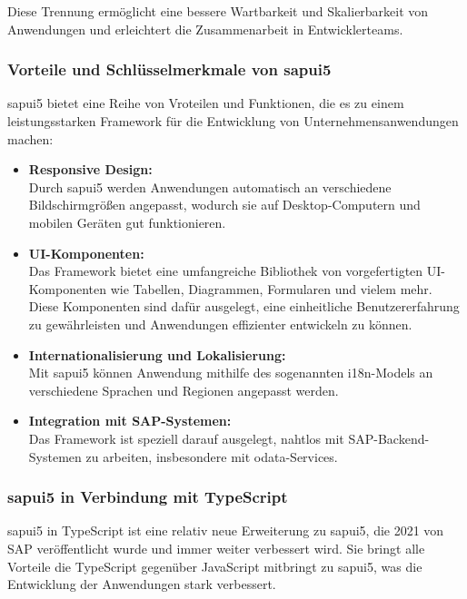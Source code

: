 Diese Trennung ermöglicht eine bessere Wartbarkeit und Skalierbarkeit von Anwendungen und erleichtert die Zusammenarbeit in Entwicklerteams.

\subsubsection[Vorteile und Schlüsselmerkmale von \gls{sapui5}]{Vorteile und Schlüsselmerkmale von \gls{sapui5}}
\gls{sapui5} bietet eine Reihe von Vroteilen und Funktionen, die es zu einem leistungsstarken Framework für die Entwicklung von Unternehmensanwendungen machen:

\begin{itemize}
    \item \textbf{Responsive Design:} \\
    Durch \gls{sapui5} werden Anwendungen automatisch an verschiedene Bildschirmgrößen angepasst, wodurch sie auf Desktop-Computern und mobilen Geräten gut funktionieren.
    \item \textbf{UI-Komponenten:} \\
    Das Framework bietet eine umfangreiche Bibliothek von vorgefertigten UI-Komponenten wie Tabellen, Diagrammen, Formularen und vielem mehr.
    Diese Komponenten sind dafür ausgelegt, eine einheitliche Benutzererfahrung zu gewährleisten und Anwendungen effizienter entwickeln zu können.
    \item \textbf{Internationalisierung und Lokalisierung:} \\
    Mit \gls{sapui5} können Anwendung mithilfe des sogenannten i18n-Models an verschiedene Sprachen und Regionen angepasst werden. 
    \item \textbf{Integration mit SAP-Systemen:} \\
    Das Framework ist speziell darauf ausgelegt, nahtlos mit SAP-Backend-Systemen zu arbeiten, insbesondere mit \gls{odata}-Services.
\end{itemize}

\subsubsection[\gls{sapui5} in Verbindung mit TypeScript]{\gls{sapui5} in Verbindung mit TypeScript}
\gls{sapui5} in TypeScript ist eine relativ neue Erweiterung zu \gls{sapui5}, die 2021 von SAP veröffentlicht wurde und immer weiter verbessert wird.
Sie bringt alle Vorteile die TypeScript gegenüber JavaScript mitbringt zu \gls{sapui5}, was die Entwicklung der Anwendungen stark verbessert.

